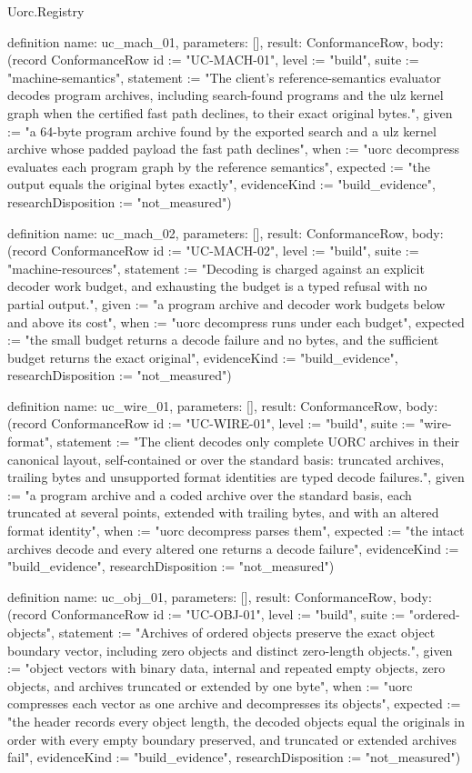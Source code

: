 \begin{lexlean}{Uorc.Registry}
\begin{semanticmodule}
definition{
  name: uc_mach_01,
  parameters: [],
  result: ConformanceRow,
  body: (record ConformanceRow {id := "UC-MACH-01", level := "build", suite := "machine-semantics", statement := "The client's reference-semantics evaluator decodes program archives, including search-found programs and the ulz kernel graph when the certified fast path declines, to their exact original bytes.", given := "a 64-byte program archive found by the exported search and a ulz kernel archive whose padded payload the fast path declines", when := "uorc decompress evaluates each program graph by the reference semantics", expected := "the output equals the original bytes exactly", evidenceKind := "build_evidence", researchDisposition := "not_measured"})
}

definition{
  name: uc_mach_02,
  parameters: [],
  result: ConformanceRow,
  body: (record ConformanceRow {id := "UC-MACH-02", level := "build", suite := "machine-resources", statement := "Decoding is charged against an explicit decoder work budget, and exhausting the budget is a typed refusal with no partial output.", given := "a program archive and decoder work budgets below and above its cost", when := "uorc decompress runs under each budget", expected := "the small budget returns a decode failure and no bytes, and the sufficient budget returns the exact original", evidenceKind := "build_evidence", researchDisposition := "not_measured"})
}

definition{
  name: uc_wire_01,
  parameters: [],
  result: ConformanceRow,
  body: (record ConformanceRow {id := "UC-WIRE-01", level := "build", suite := "wire-format", statement := "The client decodes only complete UORC archives in their canonical layout, self-contained or over the standard basis: truncated archives, trailing bytes and unsupported format identities are typed decode failures.", given := "a program archive and a coded archive over the standard basis, each truncated at several points, extended with trailing bytes, and with an altered format identity", when := "uorc decompress parses them", expected := "the intact archives decode and every altered one returns a decode failure", evidenceKind := "build_evidence", researchDisposition := "not_measured"})
}

definition{
  name: uc_obj_01,
  parameters: [],
  result: ConformanceRow,
  body: (record ConformanceRow {id := "UC-OBJ-01", level := "build", suite := "ordered-objects", statement := "Archives of ordered objects preserve the exact object boundary vector, including zero objects and distinct zero-length objects.", given := "object vectors with binary data, internal and repeated empty objects, zero objects, and archives truncated or extended by one byte", when := "uorc compresses each vector as one archive and decompresses its objects", expected := "the header records every object length, the decoded objects equal the originals in order with every empty boundary preserved, and truncated or extended archives fail", evidenceKind := "build_evidence", researchDisposition := "not_measured"})
}


\end{semanticmodule}
\end{lexlean}
